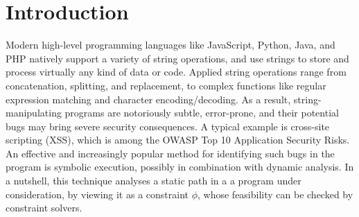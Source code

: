 
\section{Introduction}



%
Modern high-level programming languages like JavaScript, Python, Java,
and PHP natively support a variety of string operations, and use
strings to store and process virtually any kind of data or code.
Applied string operations range from concatenation, splitting, and
replacement, to complex functions like regular expression matching and
character
encoding/decoding.  As a result, string-manipulating programs are
notoriously subtle, error-prone, and their potential bugs may bring
severe security consequences. A typical example is cross-site
scripting (XSS), which is among the OWASP Top 10 Application Security
Risks.
An effective and increasingly popular method for identifying such bugs
in the program is symbolic execution, possibly in combination with dynamic
analysis. In a nutshell, this technique analyses a static path in a
a program under consideration, by viewing it as a constraint $\phi$, whose 
feasibility can be checked by constraint solvers.

